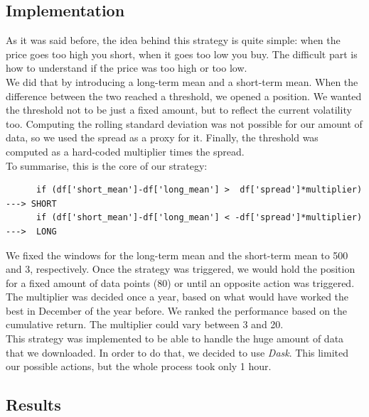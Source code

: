 \documentclass[a4paper]{article}
\begin{document}
\subsection{Implementation}

As it was said before, the idea behind this strategy is quite simple: when the price goes too high you short, when it goes too low you buy. The difficult part is how to understand if the price was too high or too low.\\
We did that by introducing a long-term mean and a short-term mean. When the difference between the two reached a threshold, we opened a position. We wanted the threshold not to be just a fixed amount, but to reflect the current volatility too. Computing the rolling standard deviation was not possible for our amount of data, so we used the spread as a proxy for it. Finally, the threshold was computed as a hard-coded multiplier times the spread.\\
To summarise, this is the core of our strategy:
\begin{verbatim}
      if (df['short_mean']-df['long_mean'] >  df['spread']*multiplier) ---> SHORT
      if (df['short_mean']-df['long_mean'] < -df['spread']*multiplier) --->  LONG
\end{verbatim}
We fixed the windows for the long-term mean and the short-term mean to 500 and 3, respectively. Once the strategy was triggered, we would hold the position for a fixed amount of data points (80) or until an opposite action was triggered.\\
The multiplier was decided once a year, based on what would have worked the best in December of the year before. We ranked the performance based on the cumulative return. The multiplier could vary between 3 and 20.\\
This strategy was implemented to be able to handle the huge amount of data that we downloaded. In order to do that, we decided to use \emph{Dask}. This limited our possible actions, but the whole process took only 1 hour.

\subsection{Results}
\end{document}
